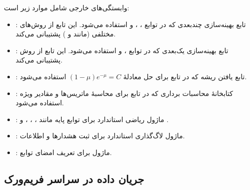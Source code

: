وابستگی‌های خارجی شامل موارد زیر است:

\begin{itemize}
	\item {}: تابع بهینه‌سازی چندبعدی  که در توابع ، ،  و  استفاده می‌شود. این تابع از روش‌های مختلفی (مانند  و ) پشتیبانی می‌کند.
	\item {}: تابع بهینه‌سازی یک‌بعدی  که در توابع ،  و  استفاده می‌شود. این تابع از روش  پشتیبانی می‌کند.
	\item {}: تابع یافتن ریشه  که در تابع  برای حل معادلۀ $(1-\mu)e^{-\mu} = C$ استفاده می‌شود.
	\item {}: کتابخانۀ محاسبات برداری که در تابع  برای محاسبۀ ماتریس‌ها و مقادیر ویژه استفاده می‌شود.
	\item {}: ماژول ریاضی استاندارد  برای توابع پایه مانند ، ، ،  و .
	\item {}: ماژول لاگ‌گذاری استاندارد  برای ثبت هشدارها و اطلاعات.
	\item {}: ماژول  برای تعریف امضای توابع.
\end{itemize}

\subsection{جریان داده در سراسر فریم‌ورک}

